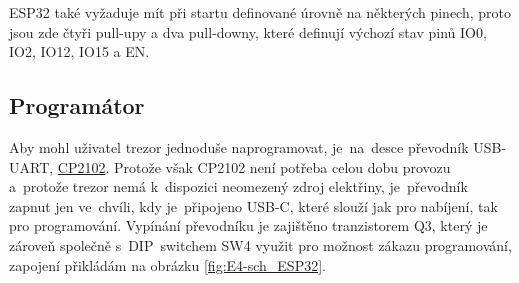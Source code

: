 ESP32 také vyžaduje mít při startu definované úrovně na některých pinech, proto jsou zde čtyři pull-upy a dva pull-downy, které definují výchozí stav
pinů IO0, IO2, IO12, IO15 a EN.  %
\begin{table}[h]
    \centering
    \caption{Popis funkce pinů}
    \label{tab:COMPARATION}
\end{table}

\newpage

\subsection*{Programátor}
Aby mohl uživatel trezor jednoduše naprogramovat, je~na~desce převodník USB-UART, \href{https://www.silabs.com/documents/public/data-sheets/cp2102n-datasheet.pdf}{CP2102}.
Protože však CP2102 není potřeba celou dobu provozu a~protože trezor nemá k~dispozici neomezený zdroj elektřiny, je~převodník zapnut jen ve~chvíli, 
kdy je~připojeno USB-C, které slouží jak pro nabíjení, tak pro programování. Vypínání převodníku je zajištěno tranzistorem Q3, který je zároveň společně
s~DIP~switchem SW4 využit pro možnost zákazu programování, zapojení přikládám na obrázku \ref{fig:E4-sch_ESP32}.

\newpage